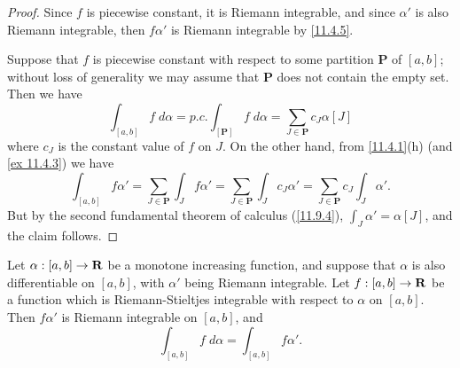 \begin{proof}
  Since \(f\) is piecewise constant, it is Riemann integrable, and since \(\alpha'\) is also Riemann integrable, then \(f \alpha'\) is Riemann integrable by \cref{11.4.5}.

  Suppose that \(f\) is piecewise constant with respect to some partition \(\mathbf{P}\) of \([a, b]\);
  without loss of generality we may assume that \(\mathbf{P}\) does not contain the empty set.
  Then we have
  \[
    \int_{[a, b]} f \; d \alpha = p.c. \int_{[\mathbf{P}]} f \; d \alpha = \sum_{J \in \mathbf{P}} c_J \alpha[J]
  \]
  where \(c_J\) is the constant value of \(f\) on \(J\).
  On the other hand, from \cref{11.4.1}(h) (and \cref{ex 11.4.3}) we have
  \[
    \int_{[a, b]} f \alpha' = \sum_{J \in \mathbf{P}} \int_J f \alpha' = \sum_{J \in \mathbf{P}} \int_J c_J \alpha' = \sum_{J \in \mathbf{P}} c_J \int_J \alpha'.
  \]
  But by the second fundamental theorem of calculus (\cref{11.9.4}), \(\int_J \alpha' = \alpha[J]\), and the claim follows.
\end{proof}

\begin{corollary}\label{11.10.3}
  Let \(\alpha : [a, b] \to \mathbf{R}\) be a monotone increasing function, and suppose that \(\alpha\) is also differentiable on \([a, b]\), with \(\alpha'\) being Riemann integrable.
  Let \(f : [a, b] \to \mathbf{R}\) be a function which is Riemann-Stieltjes integrable with respect to \(\alpha\) on \([a, b]\).
  Then \(f \alpha'\) is Riemann integrable on \([a, b]\), and
  \[
    \int_{[a, b]} f \; d \alpha = \int_{[a, b]} f \alpha'.
  \]
\end{corollary}


